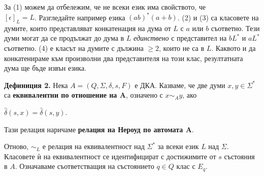 \documentclass[openany]{book}
\begin{document}
            \vspace{5pt}
        
            \hspace{15pt} За (1) можем да отбележим, че не всеки език има свойството, че \\ $[\epsilon]_L = L$.
            Разгледайте например езика $(ab)^*(a+b)$. (2) и (3) са класовете на думите,
            които представляват конкатенация на дума от $L$ с $a$ или $b$ съответно. Тези
            думи могат да се продължат до дума в $L$ \textit{единствено} с представител на $b L^*$ и $a L^*$ съответно. 
            (4) е класът на думите с дължина $\geq 2$, които не са в $L$. Каквото и да 
            конкатенираме към произволни два представителя на този клас, резултатната дума
            ще бъде извън езика.
        
            \vspace{15pt}
        
            \textbf{Дефиниция 2.} Нека $A = (Q,\Sigma,\delta,s,F)$ е ДКА. Казваме, че две думи 
            $x,y \in \Sigma^*$ са \textbf{еквивалентни по отношение на $\boldsymbol{A}$}, 
            означено с $x \sim_A y$, ако 
            \begin{center}
                $\hat{\delta}(s,x) = \hat{\delta}(s,y)$.
            \end{center}
            Тази релация наричаме \textbf{релация на Нероуд по автомата $\boldsymbol{A}$}.
            
            \vspace{5pt}
        
            Отново, $\sim_L$ е релация на еквивалентност над $\Sigma^*$ за всеки език $L$ над
            $\Sigma$. Класовете ѝ на еквивалентност се идентифицират с достижимите от $s$
            състояния в $A$. Означаваме съответстващия на състоянието $q \in Q$ клас с $E_q$.
        
            \vspace{45pt}
        
\end{document}
